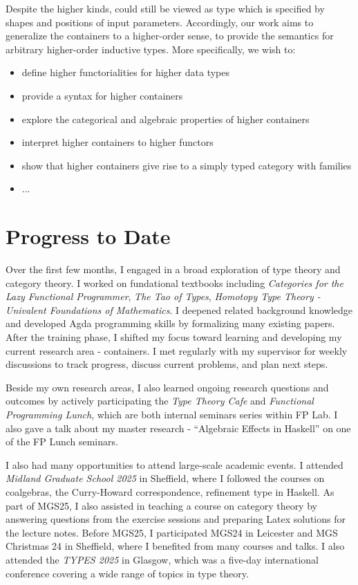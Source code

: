 Despite the higher kinds,  could still be viewed as type which is specified by shapes and positions of input parameters. Accordingly, our work aims to generalize the containers to a higher-order sense, to provide the semantics for arbitrary higher-order inductive types. More specifically, we wish to:

\begin{itemize}
  \item{define higher functorialities for higher data types}
  \item{provide a syntax for higher containers}
  \item{explore the categorical and algebraic properties of higher containers}
  \item{interpret higher containers to higher functors}
  \item{show that higher containers give rise to a simply typed category with families}
  \item{...}
\end{itemize}

\section{Progress to Date}

Over the first few months, I engaged in a broad exploration of type theory and category theory. I worked on fundational textbooks including \textit{Categories for the Lazy Functional Programmer}\cite{altenkirch2024categories}, \textit{The Tao of Types}\cite{altenkirch2021types}, \textit{Homotopy Type Theory - Univalent Foundations of Mathematics}\cite{program2013homotopy}. I deepened related background knowledge and developed Agda programming skills by formalizing many existing papers. After the training phase, I shifted my focus toward learning and developing my current research area - containers. I met regularly with my supervisor for weekly discussions to track progress, discuss current problems, and plan next steps.

Beside my own research areas, I also learned ongoing research questions and outcomes by actively participating the \textit{Type Theory Cafe} and \textit{Functional Programming Lunch}, which are both internal seminars series within FP Lab. I also gave a talk about my master research - ``Algebraic Effects in Haskell'' on one of the FP Lunch seminars.

I also had many opportunities to attend large-scale academic events. I attended \textit{Midland Graduate School 2025} in Sheffield, where I followed the courses on coalgebras, the Curry-Howard correspondence, refinement type in Haskell. As part of MGS25, I also assisted in teaching a course on category theory by answering questions from the exercise sessions and preparing Latex solutions for the lecture notes. Before MGS25, I participated MGS24 in Leicester and MGS Christmas 24 in Sheffield, where I benefited from many courses and talks. I also attended the \textit{TYPES 2025} in Glasgow, which was a five-day international conference covering a wide range of topics in type theory.

